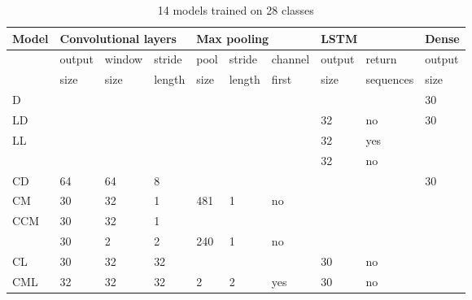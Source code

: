 \newcommand{\paint}{\cellcolor{gray!25}}
\begin{table}[!ht]
    \centering
    \footnotesize
    \caption{14 models trained on 28 classes}
    \label{tab:models}
\begin{tabular}{l||l|l|l||l|l|l||l|l||l}
\hline
Model  & \multicolumn{3}{l||}{Convolutional layers} & \multicolumn{3}{l||}{Max pooling} & \multicolumn{2}{l||}{LSTM} & Dense  \\ \hline
       & output       & window       & stride      & pool    & stride    & channel    & output     & return       & output \\ 
       & size         & size         & length      & size    & length    & first      & size       & sequences    & size   \\ \hline
                                                                                                                              \hline
D      & \paint       & \paint       &     \paint  & \paint  &  \paint   & \paint     & \paint     & \paint       & 30     \\ \hline
LD     & \paint       & \paint       &     \paint  & \paint  &  \paint   & \paint     & 32         & no           & 30     \\ \hline
LL     & \paint       & \paint       &     \paint  & \paint  &  \paint   & \paint     & 32         & yes          & \paint \\ 
       & \paint       & \paint       &     \paint  & \paint  &  \paint   & \paint     & 32         & no           & \paint \\ \hline
CD     & 64           & 64           & 8           & \paint  &  \paint   & \paint     & \paint     & \paint       & 30     \\ \hline
CM     & 30           & 32           & 1           & 481     & 1         & no         &  \paint    & \paint       & \paint \\ \hline
CCM    & 30           & 32           & 1           &         &           &            & \paint     & \paint       & \paint \\ 
       & 30           & 2            & 2           & 240     & 1         & no         & \paint     & \paint       & \paint \\ \hline
CL     & 30           & 32           & 32          & \paint  &  \paint   & \paint     & 30         & no           & \paint \\ \hline
CML    & 32           & 32           & 32          & 2       & 2         & yes        & 30         & no           & \paint \\ \hline

\end{tabular}
\end{table}
